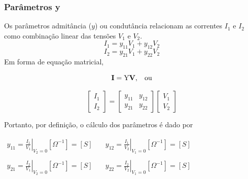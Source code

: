 \documentclass{article}
\numberwithin{equation}{section}
\begin{document}
    \subsubsection{Parâmetros y}
    \label{subsubsec:quadripolosy}
    Os parâmetros admitância ($y$) ou condutância relacionam as correntes $I_{1}$ e $I_{2}$ como combinação linear das tensões $V_{1}$ e $V_{2}$.
    \begin{equation*}
        I_{1}=y_{11}V_{1}+y_{12}V_{2}
    \end{equation*}
    \begin{equation*}
        I_{2}=y_{21}V_{1}+y_{22}V_{2}
    \end{equation*}
    Em forma de equação matricial,

    \begin{equation*}
        \textbf{I}=\text{Y}\textbf{V}, \hspace{0.3cm} \text{ou}
    \end{equation*}

    \begin{equation}
        \begin{bmatrix}
            I_{1} \\
            I_{2}
        \end{bmatrix}
        = %
        \begin{bmatrix}
            y_{11} & y_{12} \\
            y_{21} & y_{22}
        \end{bmatrix}
        \begin{bmatrix}
            V_{1} \\
            V_{2}
        \end{bmatrix}
    \end{equation}

    Portanto, por definição, o cálculo dos parâmetros é dado por
    \begin{center}
        $\begin{matrix} %
                y_{11}=\displaystyle\left.\frac{I_{1}}{V_{1}}\right|_{V_{2}=0} [\Omega^{-1}]=[S] &\quad y_{12}=\displaystyle\left.\frac{I_{1}}{V_{2}}\right|_{V_{1}=0} [\Omega^{-1}]=[S]\\ \\
                y_{21}=\displaystyle\left.\frac{I_{2}}{V_{1}}\right|_{V_{2}=0} [\Omega^{-1}]=[S] &\quad y_{22}=\displaystyle\left.\frac{I_{2}}{V_{2}}\right|_{V_{1}=0} [\Omega^{-1}]=[S]
        \end{matrix}$
    \end{center}
\end{document}
